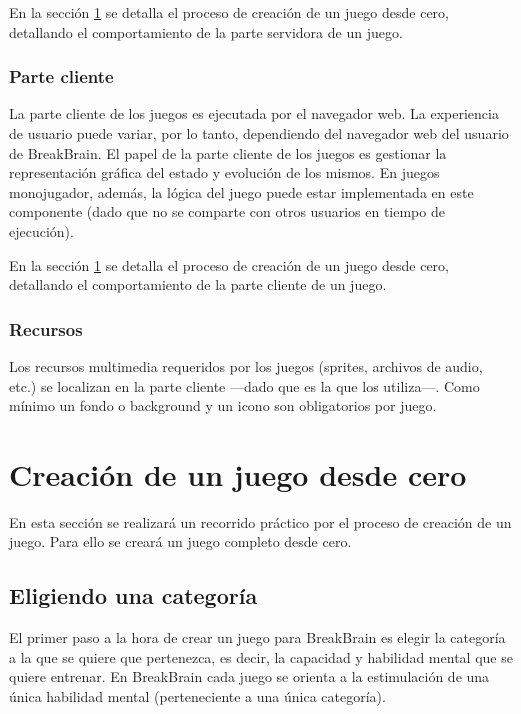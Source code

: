 En la sección \ref{sec::creacion-juego} se detalla el proceso de creación de un juego desde cero, detallando el comportamiento de la parte servidora de un juego.

\subsubsection{Parte cliente}

La parte cliente de los juegos es ejecutada por el navegador web. La experiencia de usuario puede variar, por lo tanto, dependiendo del navegador web del usuario de BreakBrain. El papel de la parte cliente de los juegos es gestionar la representación gráfica del estado y evolución de los mismos. En juegos monojugador, además, la lógica del juego puede estar implementada en este componente (dado que no se comparte con otros usuarios en tiempo de ejecución).

En la sección \ref{sec::creacion-juego} se detalla el proceso de creación de un juego desde cero, detallando el comportamiento de la parte cliente de un juego.

\subsubsection{Recursos}

Los recursos multimedia requeridos por los juegos (sprites, archivos de audio, etc.) se localizan en la parte cliente ---dado que es la que los utiliza---. Como mínimo un fondo o background y un icono son obligatorios por juego.

\section{Creación de un juego desde cero}
\label{sec::creacion-juego}

En esta sección se realizará un recorrido práctico por el proceso de creación de un juego. Para ello se creará un juego completo desde cero.

\subsection{Eligiendo una categoría}

El primer paso a la hora de crear un juego para BreakBrain es elegir la categoría a la que se quiere que pertenezca, es decir, la capacidad y habilidad mental que se quiere entrenar. En BreakBrain cada juego se orienta a la estimulación de una única habilidad mental (perteneciente a una única categoría).

